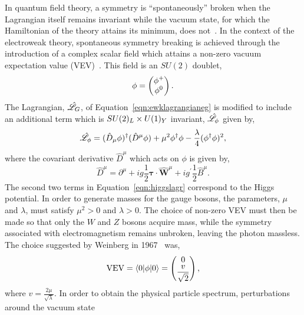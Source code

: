 In quantum field theory, a symmetry is ``spontaneously'' broken when the Lagrangian
itself remains invariant while the vacuum state, for which the Hamiltonian of the theory
attains its minimum, does not~\cite{aitchison}. In the context of the electroweak theory, 
spontaneous symmetry breaking is
achieved through the introduction of a complex scalar field which attains a non-zero 
vacuum expectation value (VEV)~\citep{Higgs:1964ia,PhysRev.155.1554,Higgs:1964pj,Guralnik:1964eu,PhysRev.145.1156}. 
This field is an $SU(2)$ doublet,
\begin{equation}
\phi = 
\everymath{\displaystyle} \begin{pmatrix}
\phi^{+} \\ 
\phi^{0}
\end{pmatrix}.
\end{equation}
The Lagrangian, $\hat{\mathscr{L}}_{G}$, of Equation~\ref{eqn:ewklagrangianeg} is modified to include
an additional term which is $SU(2)_{L}\times U(1)_{Y}$ invariant, $\hat{\mathscr{L}}_{\phi}$
given by, 
\begin{equation}
\hat{\mathscr{L}}_{\phi}=(\hat{D}_{\mu}\phi)^{\dagger}(\hat{D}^{\mu}\phi)  
	    +\mu^{2} \phi^{\dagger}\phi - \frac{\lambda}{4}(\phi^{\dagger}\phi)^{2},
\label{eqn:higgslagr}
\end{equation}
where the covariant derivative $\hat{D}^{\mu}$ which acts on $\phi$ is given by,
\begin{equation}
\hat{D}^{\mu} = \partial^{\mu} + ig\frac{1}{2}\boldsymbol{\tau}\cdot\hat{\mathbf{W}}^{\mu}
		+ ig^{\prime}\frac{1}{2} \hat{B}^{\mu}.
\end{equation}
The second two terms in Equation~\ref{eqn:higgslagr} correspond to the Higgs potential. 
In order to generate masses for the gauge bosons, the parameters, $\mu$ and $\lambda$,
must satisfy $\mu^{2}>0$ and $\lambda>0$. The choice of non-zero 
VEV must then be made so that only the $W$ and $Z$ bosons acquire mass, while the 
symmetry associated with electromagnetism remains unbroken, leaving the photon massless.
The choice suggested by Weinberg in 1967~\citep{weinberg} was,
\begin{equation}
\mathrm{VEV} = \langle0|\phi|0\rangle = 
\everymath{\displaystyle} \begin{pmatrix}
0 \\ 
\frac{v}{\sqrt{2}}
\end{pmatrix},
\end{equation}
where $v= \frac{\displaystyle 2\mu}{\displaystyle \sqrt{\lambda}}$. In order to 
obtain the physical particle spectrum, perturbations around the vacuum state
